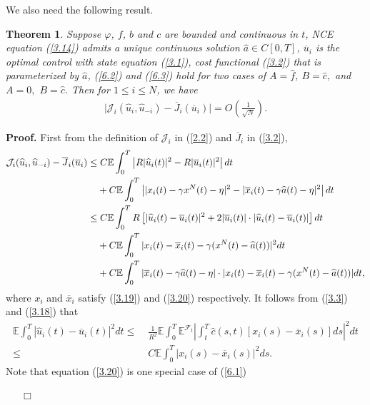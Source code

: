 \documentclass[11pt]{article}
\newtheorem{theorem}{Theorem}[section]
\newenvironment{proof}[1][Proof]{\noindent \textbf{#1.} }{\ \ \  $\Box$}
\def\dbE{\mathbb{E}}
\begin{document}
We also need the following result.
\begin{theorem}\label{theorem3.2}
Suppose $\varphi$, $f$, $b$ and $c$ are bounded and continuous in
$t$, NCE equation (\ref{3.14}) admits a unique continuous solution
$\widehat{a}\in C[0,T]$, $\overline{u}_i$ is the optimal control
with state equation (\ref{3.1}), cost functional (\ref{3.2}) that is
parameterized by $\widehat{a}$, (\ref{6.2}) and (\ref{6.3}) hold for two
cases of $A=\widehat{f}$, $B=\widehat{c},$ and $A=0,$
$B=\widehat{c}$. Then for $1\leq i\leq N$, we have
\begin{eqnarray}
\mid\mathcal{J}_i(\widehat{u}_i,\widehat{u}_{-i})-\overline{J}_i(\overline{u}_i)\mid=O\left(\frac
{1} {\sqrt{N}}\right).
\end{eqnarray}
\end{theorem}
\begin{proof}
First from the definition of $\mathcal{J}_i$ in (\ref{2.2}) and
$\overline{J}_i$ in (\ref{3.2}),
%
\begin{align*}
\mathcal{J}_{i}(\widehat{u}_{i},\widehat{u}_{-i})-\overline{J}_{i}(%
\overline{u}_{i})
\leq & \; C\dbE\int_{0}^{T}\left\vert R|\widehat{u}_{i}(t)|^{2}-R|\overline{u}%
_{i}(t)|^{2}\right\vert dt \\
&+C\dbE\int_{0}^{T}\left\vert |x_{i}(t)-\gamma x^{N}(t)-\eta |^{2}-|\overline{%
x}_{i}(t)-\gamma \widehat{a}(t)-\eta |^{2}\right\vert dt \\
\leq & \; C\dbE\int_{0}^{T}R\left[ |\widehat{u}_{i}(t)-\overline{u}%
_{i}(t)|^{2}+2|\overline{u}_{i}(t)|\cdot|\widehat{u}_{i}(t)-\overline{u}%
_{i}(t)|\right] dt \\
&+C\dbE\int_{0}^{T}|x_{i}(t)-\overline{x}_{i}(t)-\gamma (x^{N}(t)-\widehat{a}%
(t))|^{2}dt \\
&+C\dbE\int_{0}^{T}|\overline{x}_{i}(t)-\gamma \widehat{a}(t)-\eta
|\cdot |x_{i}(t)-\overline{x}_{i}(t)-\gamma
(x^{N}(t)-\widehat{a}(t))|dt,
\end{align*}
%
where $x_{i}$ and $\overline{x}_{i}$ satisfy (\ref{3.19}) and
(\ref{3.20}) respectively. It follows from (\ref{3.3}) and
(\ref{3.18}) that
%
\begin{align*}
\dbE\int_{0}^{T}|\widehat{u}_{i}(t)-\overline{u}_{i}(t)|^{2}dt
\leq & \; \frac{1}{R^{2}}\dbE\int_{0}^{T}\dbE^{\mathcal{F}_{t}}\left\vert
\int_{t}^{T}\widehat{c}(s,t)[x_{i}(s)-\overline{x}_{i}(s)]ds\right\vert ^{2}dt \\
\leq & \; C\dbE\int_{0}^{T}|x_{i}(s)-\overline{x}_{i}(s)|^{2}ds.
\end{align*}
%
Note that equation (\ref{3.20}) is one special case of (\ref{6.1})

\end{proof}
\end{document}
